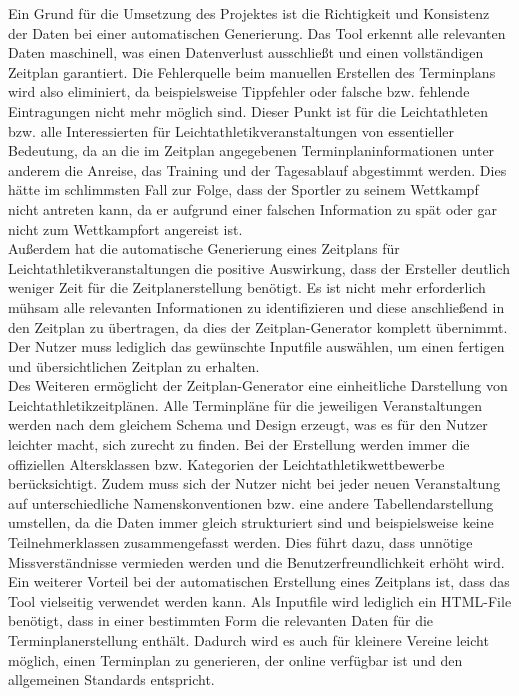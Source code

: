 Ein Grund für die Umsetzung des Projektes ist die Richtigkeit und Konsistenz der Daten bei einer automatischen Generierung. Das Tool erkennt alle relevanten Daten maschinell, was einen Datenverlust ausschließt und einen vollständigen Zeitplan garantiert. Die Fehlerquelle beim manuellen Erstellen des Terminplans wird also eliminiert, da beispielsweise Tippfehler oder falsche bzw. fehlende Eintragungen nicht mehr möglich sind. Dieser Punkt ist für die Leichtathleten bzw. alle Interessierten für Leichtathletikveranstaltungen von essentieller Bedeutung, da an die im Zeitplan angegebenen Terminplaninformationen unter anderem die Anreise, das Training und der Tagesablauf abgestimmt werden. Dies hätte im schlimmsten Fall zur Folge, dass der Sportler zu seinem Wettkampf nicht antreten kann, da er aufgrund einer falschen Information zu spät oder gar nicht zum Wettkampfort angereist ist.\\
Außerdem hat die automatische Generierung eines Zeitplans für Leichtathletikveranstaltungen die positive Auswirkung, dass der Ersteller deutlich weniger Zeit für die Zeitplanerstellung benötigt. Es ist nicht mehr erforderlich mühsam alle relevanten Informationen zu identifizieren und diese anschließend in den Zeitplan zu übertragen, da dies der Zeitplan-Generator komplett übernimmt. Der Nutzer muss lediglich das gewünschte Inputfile auswählen, um einen fertigen und übersichtlichen Zeitplan zu erhalten. \\
Des Weiteren ermöglicht der Zeitplan-Generator eine einheitliche Darstellung von Leichtathletikzeitplänen. Alle Terminpläne für die jeweiligen Veranstaltungen werden nach dem gleichem Schema und Design erzeugt, was es für den Nutzer leichter macht, sich zurecht zu finden. Bei der Erstellung werden immer die offiziellen Altersklassen bzw. Kategorien der Leichtathletikwettbewerbe berücksichtigt. Zudem muss sich der Nutzer nicht bei jeder neuen Veranstaltung auf unterschiedliche Namenskonventionen bzw. eine andere Tabellendarstellung umstellen, da die Daten immer gleich strukturiert sind und beispielsweise keine Teilnehmerklassen zusammengefasst werden. Dies führt dazu, dass unnötige Missverständnisse vermieden werden und die Benutzerfreundlichkeit erhöht wird.\\
Ein weiterer Vorteil bei der automatischen Erstellung eines Zeitplans ist, dass das Tool vielseitig verwendet werden kann. Als Inputfile wird lediglich ein HTML-File benötigt, dass in einer bestimmten Form die relevanten Daten für die Terminplanerstellung enthält. Dadurch wird es auch für kleinere Vereine leicht möglich, einen Terminplan zu generieren, der online verfügbar ist und den allgemeinen Standards entspricht.\\
